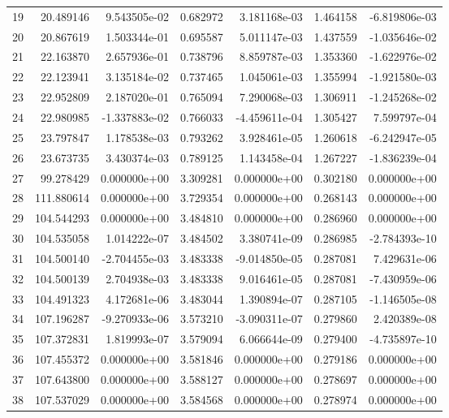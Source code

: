 \begin{tabular}{rrrrrrr}
19 &  20.489146 &  9.543505e-02 &  0.682972 &  3.181168e-03 &    1.464158 & -6.819806e-03 \\
20 &  20.867619 &  1.503344e-01 &  0.695587 &  5.011147e-03 &    1.437559 & -1.035646e-02 \\
21 &  22.163870 &  2.657936e-01 &  0.738796 &  8.859787e-03 &    1.353360 & -1.622976e-02 \\
22 &  22.123941 &  3.135184e-02 &  0.737465 &  1.045061e-03 &    1.355994 & -1.921580e-03 \\
23 &  22.952809 &  2.187020e-01 &  0.765094 &  7.290068e-03 &    1.306911 & -1.245268e-02 \\
24 &  22.980985 & -1.337883e-02 &  0.766033 & -4.459611e-04 &    1.305427 &  7.599797e-04 \\
25 &  23.797847 &  1.178538e-03 &  0.793262 &  3.928461e-05 &    1.260618 & -6.242947e-05 \\
26 &  23.673735 &  3.430374e-03 &  0.789125 &  1.143458e-04 &    1.267227 & -1.836239e-04 \\
27 &  99.278429 &  0.000000e+00 &  3.309281 &  0.000000e+00 &    0.302180 &  0.000000e+00 \\
28 & 111.880614 &  0.000000e+00 &  3.729354 &  0.000000e+00 &    0.268143 &  0.000000e+00 \\
29 & 104.544293 &  0.000000e+00 &  3.484810 &  0.000000e+00 &    0.286960 &  0.000000e+00 \\
30 & 104.535058 &  1.014222e-07 &  3.484502 &  3.380741e-09 &    0.286985 & -2.784393e-10 \\
31 & 104.500140 & -2.704455e-03 &  3.483338 & -9.014850e-05 &    0.287081 &  7.429631e-06 \\
32 & 104.500139 &  2.704938e-03 &  3.483338 &  9.016461e-05 &    0.287081 & -7.430959e-06 \\
33 & 104.491323 &  4.172681e-06 &  3.483044 &  1.390894e-07 &    0.287105 & -1.146505e-08 \\
34 & 107.196287 & -9.270933e-06 &  3.573210 & -3.090311e-07 &    0.279860 &  2.420389e-08 \\
35 & 107.372831 &  1.819993e-07 &  3.579094 &  6.066644e-09 &    0.279400 & -4.735897e-10 \\
36 & 107.455372 &  0.000000e+00 &  3.581846 &  0.000000e+00 &    0.279186 &  0.000000e+00 \\
37 & 107.643800 &  0.000000e+00 &  3.588127 &  0.000000e+00 &    0.278697 &  0.000000e+00 \\
38 & 107.537029 &  0.000000e+00 &  3.584568 &  0.000000e+00 &    0.278974 &  0.000000e+00 \\

\end{tabular}
